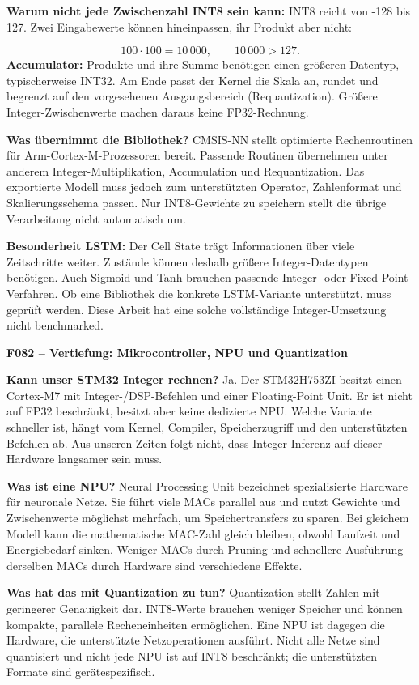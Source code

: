 \documentclass[11pt,a4paper]{article}
\begin{document}
\textbf{Warum nicht jede Zwischenzahl INT8 sein kann:} INT8 reicht von -128 bis 127. Zwei Eingabewerte können hineinpassen, ihr Produkt aber nicht:

\[100\cdot100=10\,000,\qquad 10\,000>127.\]
\textbf{Accumulator:} Produkte und ihre Summe benötigen einen größeren Datentyp, typischerweise INT32. Am Ende passt der Kernel die Skala an, rundet und begrenzt auf den vorgesehenen Ausgangsbereich (Requantization). Größere Integer-Zwischenwerte machen daraus keine FP32-Rechnung.

\textbf{Was übernimmt die Bibliothek?} CMSIS-NN stellt optimierte Rechenroutinen für Arm-Cortex-M-Prozessoren bereit. Passende Routinen übernehmen unter anderem Integer-Multiplikation, Accumulation und Requantization. Das exportierte Modell muss jedoch zum unterstützten Operator, Zahlenformat und Skalierungsschema passen. Nur INT8-Gewichte zu speichern stellt die übrige Verarbeitung nicht automatisch um.

\textbf{Besonderheit LSTM:} Der Cell State trägt Informationen über viele Zeitschritte weiter. Zustände können deshalb größere Integer-Datentypen benötigen. Auch Sigmoid und Tanh brauchen passende Integer- oder Fixed-Point-Verfahren. Ob eine Bibliothek die konkrete LSTM-Variante unterstützt, muss geprüft werden. Diese Arbeit hat eine solche vollständige Integer-Umsetzung nicht benchmarked.

\clearpage
{\large\bfseries\color{accent}F082 -- Vertiefung: Mikrocontroller, NPU und Quantization}\par
\textbf{Kann unser STM32 Integer rechnen?} Ja. Der STM32H753ZI besitzt einen Cortex-M7 mit Integer-/\allowbreak{}DSP-Befehlen und einer Floating-Point Unit. Er ist nicht auf FP32 beschränkt, besitzt aber keine dedizierte NPU. Welche Variante schneller ist, hängt vom Kernel, Compiler, Speicherzugriff und den unterstützten Befehlen ab. Aus unseren Zeiten folgt nicht, dass Integer-Inferenz auf dieser Hardware langsamer sein muss.

\textbf{Was ist eine NPU?} Neural Processing Unit bezeichnet spezialisierte Hardware für neuronale Netze. Sie führt viele MACs parallel aus und nutzt Gewichte und Zwischenwerte möglichst mehrfach, um Speichertransfers zu sparen. Bei gleichem Modell kann die mathematische MAC-Zahl gleich bleiben, obwohl Laufzeit und Energiebedarf sinken. Weniger MACs durch Pruning und schnellere Ausführung derselben MACs durch Hardware sind verschiedene Effekte.

\textbf{Was hat das mit Quantization zu tun?} Quantization stellt Zahlen mit geringerer Genauigkeit dar. INT8-Werte brauchen weniger Speicher und können kompakte, parallele Recheneinheiten ermöglichen. Eine NPU ist dagegen die Hardware, die unterstützte Netzoperationen ausführt. Nicht alle Netze sind quantisiert und nicht jede NPU ist auf INT8 beschränkt; die unterstützten Formate sind gerätespezifisch.
\end{document}
